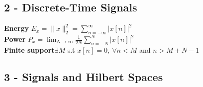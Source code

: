 \documentclass{article}
\begin{document}
\subsection{2 - Discrete-Time Signals}
\begin{multicols}{2}
\textbf{Energy} $\displaystyle E_x = \|x\|_2^2 = \sum_{n=-\infty}^{\infty} {\left | x[n] \right |}^2 $ \\
\textbf{Power} $ P_x =\lim_{N\to\infty} \frac1{2N} \sum_{n=-N}^{N}{\left | x[n] \right |}^2 $\\
\textbf{Finite support}$\exists M$ s.t $x[n] = 0,\  \forall n<M$ and $ n>M+N-1$
\end{multicols}
\subsection{3 - Signals and Hilbert Spaces} 
\end{document}
